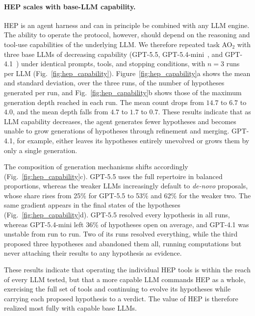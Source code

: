 \FloatBarrier

\paragraph{HEP scales with base-LLM capability.}
HEP is an agent harness and can in principle be combined with any LLM
engine.
The ability to operate the protocol, however, should depend on the
reasoning and tool-use capabilities of the underlying LLM.
We therefore repeated task AO$_2$ with three base LLMs of
decreasing capability (GPT-5.5, GPT-5.4-mini~\cite{OpenAI2026GPT54Mini},
and GPT-4.1~\cite{OpenAI2025GPT41}) under
identical prompts, tools, and stopping conditions, with $n=3$ runs per
LLM (Fig.~\ref{fig:hep_capability}).
Figure~\ref{fig:hep_capability}a shows the mean and standard deviation,
over the three runs, of the number of hypotheses generated per run, and
Fig.~\ref{fig:hep_capability}b shows those of the maximum generation
depth reached in each run.
The mean count drops from $14.7$ to $6.7$ to $4.0$, and the mean depth
falls from $4.7$ to $1.7$ to $0.7$.
These results indicate that as LLM capability decreases, the agent
generates fewer hypotheses and becomes unable to grow generations of
hypotheses through refinement and merging.
GPT-4.1, for example, either leaves its hypotheses entirely unevolved
or grows them by only a single generation.

The composition of generation mechanisms shifts accordingly
(Fig.~\ref{fig:hep_capability}c).
GPT-5.5 uses the full repertoire in balanced proportions, whereas the
weaker LLMs increasingly default to \emph{de-novo} proposals, whose
share rises from 25\% for GPT-5.5 to 53\% and 62\% for the weaker two.
The same gradient appears in the final states of the hypotheses
(Fig.~\ref{fig:hep_capability}d).
GPT-5.5 resolved every hypothesis in all runs, whereas GPT-5.4-mini left
36\% of hypotheses open on average, and GPT-4.1 was unstable from run to
run.
Two of its runs resolved everything, while the third proposed three
hypotheses and abandoned them all, running computations but never
attaching their results to any hypothesis as evidence.

These results indicate that operating the individual HEP tools is
within the reach of every LLM tested, but that a more capable LLM
commands HEP as a whole, exercising the full set of tools and
continuing to evolve its hypotheses while carrying each proposed
hypothesis to a verdict.
The value of HEP is therefore realized most fully with capable base
LLMs.

